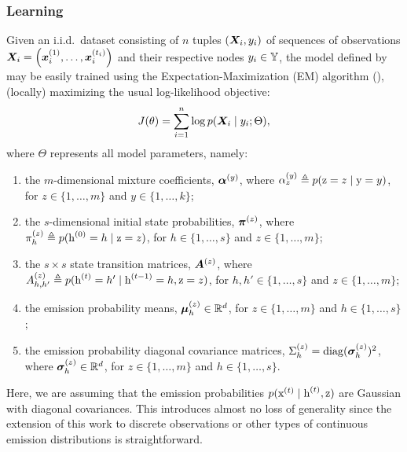 \subsubsection{Learning}
\label{sec:spamhmm_learning}
Given an i.i.d.\ dataset consisting of $n$ tuples $({\bm{X}}_i, y_i)$ of sequences of observations ${\bm{X}}_i = \left({\bm{x}}_i^{(1)}, \dots,{\bm{x}}_i^{(t_i)} \right)$ and their respective nodes $y_i \in {\mathbb{Y}}$, the model defined by  may be easily trained using the Expectation-Maximization (EM) algorithm (\citet{Dempster1977}), (locally) maximizing the usual log-likelihood objective:
\begin{equation}
\label{eq:spamhmm_log_likelihood}
J(\theta) = \sum_{i=1}^n \log p({\bm{X}}_i \mid y_i; \Theta),
\end{equation}
where $\Theta$ represents all model parameters, namely:
\begin{enumerate}
	\item the $m$-dimensional mixture coefficients, ${\bm{\alpha}}^{(y)}$, where $ {\alpha}^{(y)}_z \triangleq p({\textnormal{z}}=z \mid {\textnormal{y}}=y)$, for $z \in \{1,\dots,m\}$ and $y \in \{ 1,\dots,k \}$;
	\item the $s$-dimensional initial state probabilities, ${\bm{\pi}}^{(z)}$, where ${\pi}_h^{(z)} \triangleq p({\textnormal{h}}^{(0)}=h \mid {\textnormal{z}}=z)$, for $h \in \{1,\dots,s\}$ and $z \in \{1,\dots,m\}$;
	\item the $s \times s$ state transition matrices, ${\bm{A}}^{(z)}$, where ${A}^{(z)}_{h,h'} \triangleq p({\textnormal{h}}^{(t)}=h' \mid {\textnormal{h}}^{(t-1)}=h, {\textnormal{z}}=z)$, for $h,h' \in \{1,\dots,s\}$ and $z \in \{1,\dots,m\}$;
	\item the emission probability means, ${\bm{\mu}}^{(z)}_h \in \mathbb{R}^d$, for $z \in \{1,\dots,m\}$ and $h \in \{1,\dots,s\}$;
	\item the emission probability diagonal covariance matrices, $\Sigma^{(z)}_h = \mathrm{diag}({\bm{\sigma}}^{(z)}_h)^2$, where ${\bm{\sigma}}^{(z)}_h \in \mathbb{R}^d$, for $z \in \{1,\dots,m\}$ and $h \in \{1,\dots,s\}$.
\end{enumerate}

Here, we are assuming that the emission probabilities $p({\textnormal{x}}^{(t)}\mid{\textnormal{h}}^{(t)},{\textnormal{z}})$ are Gaussian with diagonal covariances. This introduces almost no loss of generality since the extension of this work to discrete observations or other types of continuous emission distributions is straightforward.

